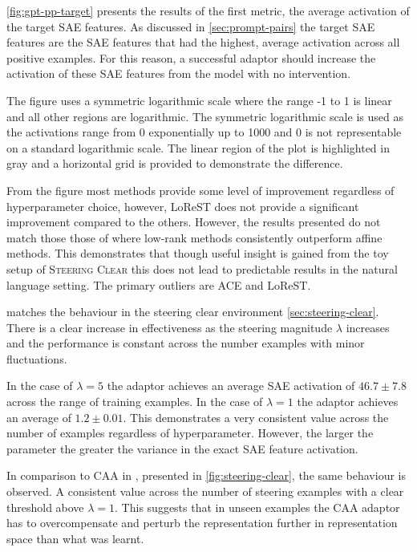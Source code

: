 \cref{fig:gpt-pp-target} presents the results of the first metric, the average activation of the target SAE features.
As discussed in \cref{sec:prompt-pairs} the target SAE features are the SAE features that had the highest, average activation across all positive examples.
For this reason, a successful adaptor should increase the activation of these SAE features from the model with no intervention.

The figure uses a symmetric logarithmic scale where the range -1 to 1 is linear and all other regions are logarithmic.
The symmetric logarithmic scale is used as the activations range from 0 exponentially up to 1000 and 0 is not representable on a standard logarithmic scale.
The linear region of the plot is highlighted in gray and a horizontal grid is provided to demonstrate the difference.

From the figure most methods provide some level of improvement regardless of hyperparameter choice, however, LoReST does not provide a significant improvement compared to the others.
However, the results presented do not match those those of \citet{steering-clear} where low-rank methods consistently outperform affine methods.
This demonstrates that though useful insight is gained from the toy setup of \textsc{Steering Clear} this does not lead to predictable results in the natural language setting.
The primary outliers are ACE and LoReST.

 matches the behaviour in the steering clear environment \cref{sec:steering-clear}.
There is a clear increase in effectiveness as the steering magnitude $\lambda$ increases and the performance is constant across the number examples with minor fluctuations.

In the case of $\lambda = 5$ the adaptor achieves an average SAE activation of $46.7 \pm 7.8$ across the range of training examples.
In the case of $\lambda = 1$ the adaptor achieves an average of $1.2 \pm 0.01$.
This demonstrates a very consistent value across the number of examples regardless of hyperparameter.
However, the larger the parameter the greater the variance in the exact SAE feature activation.

In comparison to CAA in \citet{steering-clear}, presented in \cref{fig:steering-clear}, the same behaviour is observed.
A consistent value across the number of steering examples with a clear threshold above $\lambda = 1$.
This suggests that in unseen examples the CAA adaptor has to overcompensate and perturb the representation further in representation space than what was learnt.

